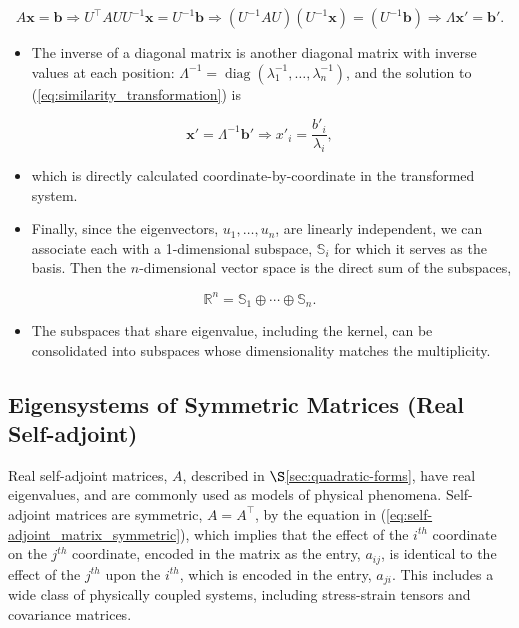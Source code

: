 \documentclass[12pt, twoside, draft]{article}
\begin{document}
\begin{equation}\label{eq:similarity_transformation}
A \mathbf{x} = \mathbf{b} \Rightarrow U^\top A U U^{-1} \mathbf{x} = U^{-1} \mathbf{b} \Rightarrow (U^{-1} A U)(U^{-1} \mathbf{x}) = (U^{-1} \mathbf{b}) \Rightarrow \Lambda \mathbf{x}' = \mathbf{b}'.
\end{equation}
\begin{itemize}
\item[] The inverse of a diagonal matrix is another diagonal matrix with inverse values at each position:  $\Lambda^{-1} = \operatorname{diag}(\lambda_1^{-1}, \ldots, \lambda_n^{-1})$, and the solution to (\ref{eq:similarity_transformation}) is
\end{itemize}
\begin{equation}\label{eq:solution_bi-orthogonal_basis}
\mathbf{x}' = \Lambda^{-1} \mathbf{b}' \Rightarrow x'_i = \frac{b'_i}{\lambda_i},
\end{equation}
\begin{itemize}
\item[] which is directly calculated coordinate-by-coordinate in the transformed system.
\item Finally, since the eigenvectors, $u_1, \ldots, u_n$, are linearly independent, we can associate each with a 1-dimensional subspace, $\mathbb{S}_i$ for which it serves as the basis.  Then the $n$-dimensional vector space is the direct sum of the subspaces,
\end{itemize}
\begin{equation}\label{eq:eigenvector_partition}
\mathbb{R}^n = \mathbb{S}_1 \oplus \cdots \oplus \mathbb{S}_n.
\end{equation}
\begin{itemize}
\item[] The subspaces that share eigenvalue, including the kernel, can be consolidated into subspaces whose dimensionality matches the multiplicity.
\end{itemize}

\subsection{Eigensystems of Symmetric Matrices (Real Self-adjoint)}\label{sec:eigensystems-self-adjoint}
Real self-adjoint matrices, $A$, described in $\S$\ref{sec:quadratic-forms}, have real eigenvalues, and are commonly used as models of physical phenomena.  Self-adjoint matrices are symmetric, $A = A^\top$, by the equation in (\ref{eq:self-adjoint_matrix_symmetric}), which implies that the effect of the $i^{th}$ coordinate on the $j^{th}$ coordinate, encoded in the matrix as the entry, $a_{ij}$, is identical to the effect of the $j^{th}$ upon the $i^{th}$, which is encoded in the entry, $a_{ji}$.  This includes a wide class of physically coupled systems, including stress-strain tensors and covariance matrices.
\end{document}

